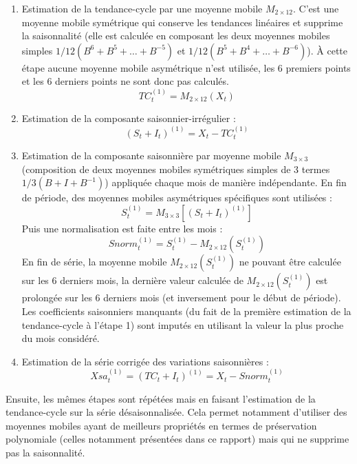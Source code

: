 \documentclass[
  11pt,
  french,
  a4paper]{article}
\newcommand\1{\mathds{1}}
\begin{document}
\begin{enumerate}
\def\labelenumi{\arabic{enumi}.}
\item
  Estimation de la tendance-cycle par une moyenne mobile \(M_{2\times 12}\).
  C'est une moyenne mobile symétrique qui conserve les tendances linéaires et supprime la saisonnalité (elle est calculée en composant les deux moyennes mobiles simples \(1/12(B^6+B^5+\dots+B^{-5})\) et \(1/12(B^5+B^4+\dots+B^{-6})\)).
  À cette étape aucune moyenne mobile asymétrique n'est utilisée, les 6 premiers points et les 6 derniers points ne sont donc pas calculés.
  \[
  TC_t^{(1)}=M_{2\times 12}(X_t)
  \]
\item
  Estimation de la composante saisonnier-irrégulier :
  \[
  (S_t+I_t)^{(1)}= X_t - TC_t^{(1)}
  \]
\item
  Estimation de la composante saisonnière par moyenne mobile \(M_{3\times 3}\) (composition de deux moyennes mobiles symétriques simples de 3 termes \(1/3(B+I+B^{-1})\)) appliquée chaque mois de manière indépendante.
  En fin de période, des moyennes mobiles asymétriques spécifiques sont utilisées :
  \[
  S_t^{(1)}= M_{3\times 3}\left[(S_t+I_t)^{(1)}\right]
  \]
  Puis une normalisation est faite entre les mois :
  \[
  Snorm_t^{(1)}= S_t^{(1)} - M_{2\times 12}\left(S_t^{(1)}\right)
  \]
  En fin de série, la moyenne mobile \(M_{2\times 12}\left(S_t^{(1)}\right)\) ne pouvant être calculée sur les 6 derniers mois, la dernière valeur calculée de \(M_{2\times 12}\left(S_t^{(1)}\right)\) est prolongée sur les 6 derniers mois (et inversement pour le début de période).
  Les coefficients saisonniers manquants (du fait de la première estimation de la tendance-cycle à l'étape 1) sont imputés en utilisant la valeur la plus proche du mois considéré.
\item
  Estimation de la série corrigée des variations saisonnières :
  \[
  Xsa_t^{(1)}= (TC_t+I_t)^{(1)} = X_t - Snorm_t^{(1)}
  \]
\end{enumerate}

Ensuite, les mêmes étapes sont répétées mais en faisant l'estimation de la tendance-cycle sur la série désaisonnalisée.
Cela permet notamment d'utiliser des moyennes mobiles ayant de meilleurs propriétés en termes de préservation polynomiale (celles notamment présentées dans ce rapport) mais qui ne supprime pas la saisonnalité.
\end{document}
